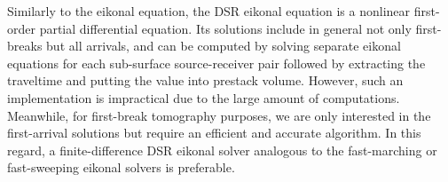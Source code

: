 
Similarly to the eikonal equation, the DSR eikonal equation is a nonlinear first-order partial differential 
equation. Its solutions include in general not only first-breaks but all arrivals, and can 
be computed by solving separate eikonal equations for each sub-surface source-receiver pair followed by 
extracting the traveltime and putting the value into prestack volume. However, such an implementation is 
impractical due to the large amount of computations. Meanwhile, for first-break tomography 
purposes, we are only interested in the first-arrival solutions but require an efficient and 
accurate algorithm. In this regard, a finite-difference DSR eikonal solver analogous to the fast-marching 
\cite[]{sethian} or fast-sweeping \cite[]{zhao} eikonal solvers is preferable.

